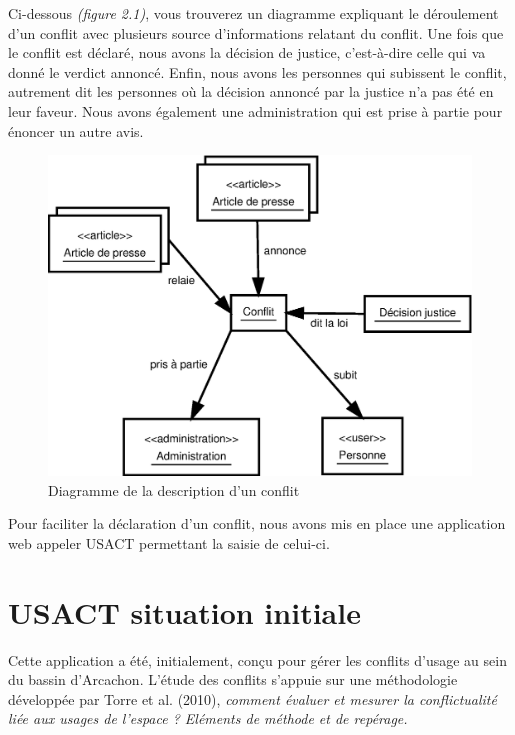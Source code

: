 \documentclass[12pt,a4paper,titlepage,twoside]{report}
\begin{document}
Ci-dessous \textit{(figure 2.1)}, vous trouverez un diagramme expliquant le déroulement d'un conflit avec plusieurs source d'informations relatant du conflit. Une fois que le conflit est déclaré, nous avons la décision de justice, c'est-à-dire celle qui va donné le verdict annoncé. \newline
Enfin, nous avons les personnes qui subissent le conflit, autrement dit les personnes où la décision annoncé par la justice n'a pas été en leur faveur. Nous avons également une administration qui est prise à partie pour énoncer un autre avis.

\clearpage
\begin{figure}
\centering
\includegraphics[width=\textwidth]{Image/ExplicationConflit.eps}
\caption{Diagramme de la description d'un conflit}
\end{figure}

Pour faciliter la déclaration d'un conflit, nous avons mis en place une application web appeler USACT permettant la saisie de celui-ci.

\section{USACT situation initiale}
Cette application a été, initialement, conçu pour gérer les conflits d'usage au sein du bassin d'Arcachon. L’étude des conflits s’appuie sur une méthodologie développée par Torre et al. (2010), \emph{comment évaluer et mesurer la conflictualité liée aux usages de l'espace ? Eléments de méthode et de repérage.} \newline \newline
\end{document}
